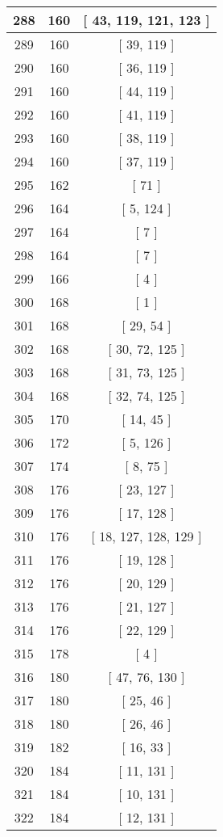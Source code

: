 \begin{center}
\begin{longtable}[H]{|| c c c ||}
\hline
288 & 160 & [ 43, 119, 121, 123 ] \\ 
\hline
289 & 160 & [ 39, 119 ] \\ 
\hline
290 & 160 & [ 36, 119 ] \\ 
\hline
291 & 160 & [ 44, 119 ] \\ 
\hline
292 & 160 & [ 41, 119 ] \\ 
\hline
293 & 160 & [ 38, 119 ] \\ 
\hline
294 & 160 & [ 37, 119 ] \\ 
\hline
295 & 162 & [ 71 ] \\ 
\hline
296 & 164 & [ 5, 124 ] \\ 
\hline
297 & 164 & [ 7 ] \\ 
\hline
298 & 164 & [ 7 ] \\ 
\hline
299 & 166 & [ 4 ] \\ 
\hline
300 & 168 & [ 1 ] \\ 
\hline
301 & 168 & [ 29, 54 ] \\ 
\hline
302 & 168 & [ 30, 72, 125 ] \\ 
\hline
303 & 168 & [ 31, 73, 125 ] \\ 
\hline
304 & 168 & [ 32, 74, 125 ] \\ 
\hline
305 & 170 & [ 14, 45 ] \\ 
\hline
306 & 172 & [ 5, 126 ] \\ 
\hline
307 & 174 & [ 8, 75 ] \\ 
\hline
308 & 176 & [ 23, 127 ] \\ 
\hline
309 & 176 & [ 17, 128 ] \\ 
\hline
310 & 176 & [ 18, 127, 128, 129 ] \\ 
\hline
311 & 176 & [ 19, 128 ] \\ 
\hline
312 & 176 & [ 20, 129 ] \\ 
\hline
313 & 176 & [ 21, 127 ] \\ 
\hline
314 & 176 & [ 22, 129 ] \\ 
\hline
315 & 178 & [ 4 ] \\ 
\hline
316 & 180 & [ 47, 76, 130 ] \\ 
\hline
317 & 180 & [ 25, 46 ] \\ 
\hline
318 & 180 & [ 26, 46 ] \\ 
\hline
319 & 182 & [ 16, 33 ] \\ 
\hline
320 & 184 & [ 11, 131 ] \\ 
\hline
321 & 184 & [ 10, 131 ] \\ 
\hline
322 & 184 & [ 12, 131 ] \\ 

\end{longtable}
\end{center}

